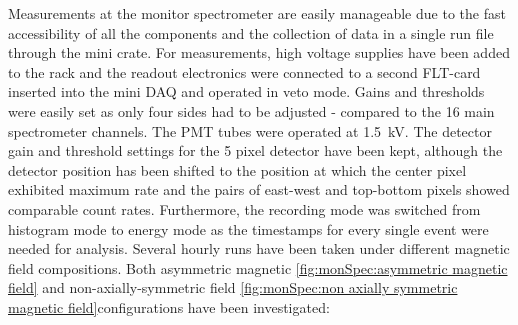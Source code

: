   Measurements at the monitor spectrometer are easily manageable due to the fast accessibility of all the components and the collection of data in a single run file through the mini crate.
  For measurements, high voltage supplies have been added to the  rack and the readout electronics were connected to a second FLT-card inserted into the mini DAQ and operated in veto mode. Gains and thresholds were easily set as only four sides had to be adjusted - compared to the 16 main spectrometer channels. The PMT tubes were operated at \SI{1.5}{\kilo\volt}. The detector gain and threshold settings for the 5 pixel detector have been kept, although the detector position has been shifted to the position at which the center pixel exhibited maximum rate and the pairs of east-west and top-bottom pixels showed comparable count rates. Furthermore, the recording mode was switched from histogram mode to energy mode as the timestamps for every single event were needed for analysis. 
  Several hourly runs have been taken under different magnetic field compositions. Both asymmetric magnetic \ref{fig:monSpec:asymmetric magnetic field} and non-axially-symmetric field \ref{fig:monSpec:non axially symmetric magnetic field}configurations have been investigated: \todo{}
